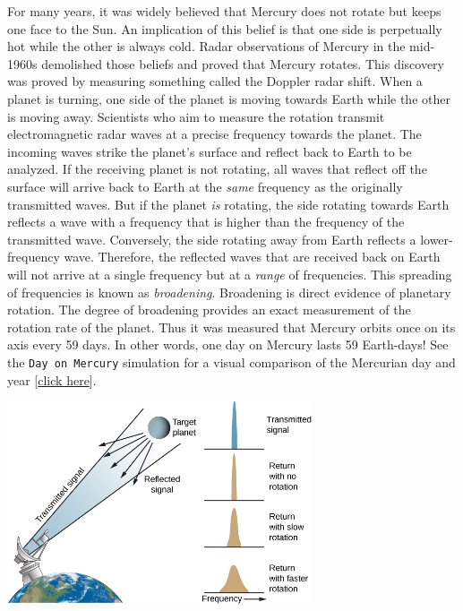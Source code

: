 \documentclass{article}
\numberwithin{equation}{section}
\numberwithin{figure}{section}
\begin{document}
For many years, it was widely believed that Mercury does not rotate but keeps one face to the Sun. An implication of this belief is that one side is perpetually hot while the other is always cold. Radar observations of Mercury in the mid-1960s demolished those beliefs and proved that Mercury rotates.  This discovery was proved by measuring something called the Doppler radar shift. When a planet is turning, one side of the planet is moving towards Earth while the other is moving away. Scientists who aim to measure the rotation transmit electromagnetic radar waves at a precise frequency towards the planet. The incoming waves strike the planet's surface and reflect back to Earth to be analyzed. If the receiving planet is not rotating, all waves that reflect off the surface will arrive back to Earth at the \textit{same} frequency as the originally transmitted waves. But if the planet \textit{is} rotating, the side rotating towards Earth reflects a wave with a frequency that is higher than the frequency of the transmitted wave. Conversely, the side rotating away from Earth reflects a lower-frequency wave. Therefore, the reflected waves that are received back on Earth will not arrive at a single frequency but at a \textit{range} of frequencies. This spreading of frequencies is known as \textit{broadening}. Broadening is direct evidence of planetary rotation. The degree of broadening provides an exact measurement of the rotation rate of the planet. Thus it was measured that Mercury orbits once on its axis every 59 days. In other words, one day on Mercury lasts 59 Earth-days! See the \texttt{Day on Mercury} simulation for a visual comparison of the Mercurian day and year [\href{https://sciencesims.com/sims/mercury-orbit/}{click here}].

\begin{center}
    \includegraphics[width=9cm]{Figures/Figure9.21.jpeg}
    \captionsetup{type=figure,margin=1in}
\end{center}
\end{document}
